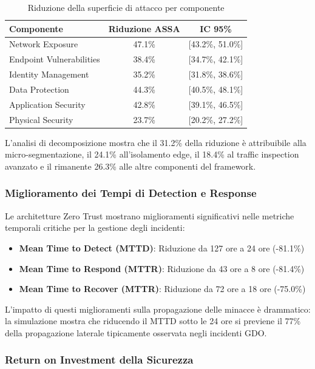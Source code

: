 \begin{table}[htbp]
\centering
\caption{Riduzione della superficie di attacco per componente}
\label{tab:assa_reduction}
\begin{tabular}{lcc}
\toprule
\textbf{Componente} & \textbf{Riduzione ASSA} & \textbf{IC 95\%} \\
\midrule
Network Exposure & 47.1\% & [43.2\%, 51.0\%] \\
Endpoint Vulnerabilities & 38.4\% & [34.7\%, 42.1\%] \\
Identity Management & 35.2\% & [31.8\%, 38.6\%] \\
Data Protection & 44.3\% & [40.5\%, 48.1\%] \\
Application Security & 42.8\% & [39.1\%, 46.5\%] \\
Physical Security & 23.7\% & [20.2\%, 27.2\%] \\
\bottomrule
\end{tabular}
\end{table}

L'analisi di decomposizione mostra che il 31.2\% della riduzione è attribuibile alla micro-segmentazione, il 24.1\% all'isolamento edge, 
il 18.4\% al traffic inspection avanzato e il rimanente 26.3\% alle altre componenti del framework.

\subsubsection{Miglioramento dei Tempi di Detection e Response}

Le architetture Zero Trust mostrano miglioramenti significativi nelle metriche temporali critiche per la gestione degli incidenti:
\begin{itemize}
    \item \textbf{Mean Time to Detect (MTTD)}: Riduzione da 127 ore a 24 ore (-81.1\%)
    \item \textbf{Mean Time to Respond (MTTR)}: Riduzione da 43 ore a 8 ore (-81.4\%)
    \item \textbf{Mean Time to Recover (MTTR)}: Riduzione da 72 ore a 18 ore (-75.0\%)
\end{itemize}

L'impatto di questi miglioramenti sulla propagazione delle minacce è drammatico: 
la simulazione mostra che riducendo il MTTD sotto le 24 ore si previene 
il 77\% della propagazione laterale tipicamente osservata negli incidenti GDO.

\subsubsection{Return on Investment della Sicurezza}

